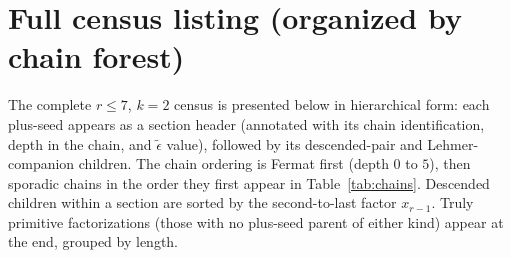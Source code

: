 \documentclass[11pt]{article}
\theoremstyle{definition}
\theoremstyle{remark}
\newcommand{\eps}{\tilde{\epsilon}}
\begin{document}
\section{Full census listing (organized by chain forest)}\label{app:full-census}

The complete $r \le 7$, $k = 2$ census is presented below in
hierarchical form: each plus-seed appears as a section header
(annotated with its chain identification, depth in the chain, and
$\eps$ value), followed by its descended-pair and Lehmer-companion
children.  The chain ordering is Fermat first (depth $0$ to $5$), then
sporadic chains in the order they first appear in
Table~\ref{tab:chains}.  Descended children within a section are
sorted by the second-to-last factor $x_{r-1}$.  Truly primitive
factorizations (those with no plus-seed parent of either kind) appear
at the end, grouped by length.
\end{document}

